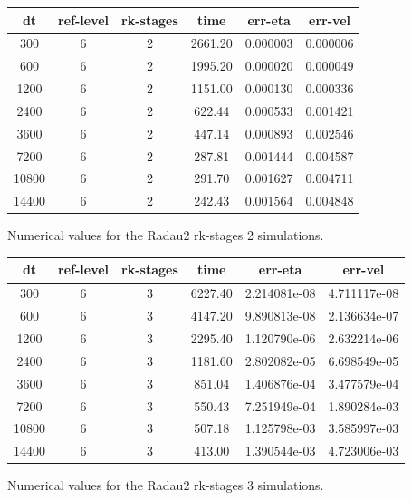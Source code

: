 \documentclass[a4paper, 12pt]{article}
\begin{document}
\begin{tabular}{c|c|c|c|c|c}
dt    & ref-level &  rk-stages & time    & err-eta      &    err-vel \\ \hline
300   &        6   &        2 &  2661.20 &  0.000003 &  0.000006\\
600    &       6   &        2 &  1995.20 &  0.000020 &  0.000049\\
1200  &         6   &        2 &  1151.00 &  0.000130 &  0.000336\\
2400   &        6   &        2 &   622.44 &  0.000533 &  0.001421\\
3600   &        6   &        2 &   447.14 &  0.000893 &  0.002546\\
7200    &       6   &        2 &   287.81 &  0.001444 &  0.004587\\
10800   &        6  &         2 &   291.70 &  0.001627 &  0.004711\\
14400    &       6  &         2 &   242.43 &  0.001564 &  0.004848\\
\end{tabular}
{Numerical values for the Radau2 rk-stages 2 simulations.}
\\
\begin{tabular}{c|c|c|c|c|c}
dt    & ref-level &  rk-stages & time    & err-eta      &    err-vel \\ \hline
300    &       6   &        3  & 6227.40 &  2.214081e-08 &  4.711117e-08\\
600    &       6   &        3 &  4147.20 &  9.890813e-08 &  2.136634e-07\\
1200    &       6  &         3&   2295.40 &  1.120790e-06 &  2.632214e-06\\
2400    &       6  &         3 &  1181.60 &  2.802082e-05 &  6.698549e-05\\
3600    &       6  &         3 &   851.04 &  1.406876e-04 &  3.477579e-04\\
7200    &       6  &         3  &  550.43 &  7.251949e-04 &  1.890284e-03\\
10800   &        6  &         3 &   507.18 &  1.125798e-03 &  3.585997e-03\\
14400     &      6  &         3 &   413.00 &  1.390544e-03 &  4.723006e-03\\
\end{tabular}
{Numerical values for the Radau2 rk-stages 3 simulations.}
\\
\end{document}
